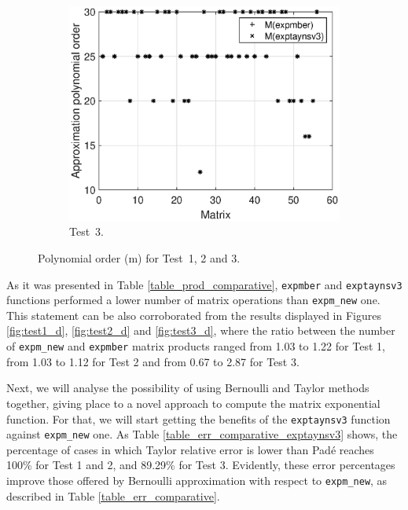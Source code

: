 \documentclass[preprint,10pt,numbers,sort&compress]{elsarticle}
\begin{document}
\begin{figure}[t]
\begin{subfigure}[b]{0.48\textwidth}
\end{subfigure}
\begin{subfigure}[b]{0.48\textwidth}
\includegraphics[scale=0.44]{polynomial_order_exp_toolbox_n128_nd256-exp_eigtool_n128_nd256_expmber.eps}
\caption{\footnotesize Test~3.}
\label{fig:m_value_test3}
\end{subfigure}
\caption{Polynomial order (m) for Test~1, 2 and 3.}
\label{fig:m_value}
\end{figure}

As it was presented in Table \ref{table_prod_comparative}, \texttt{expmber} and \texttt{exptaynsv3} functions performed a lower number of matrix operations than \texttt{expm\_new} one. This statement can be also corroborated from the results displayed in Figures \ref{fig:test1_d}, \ref{fig:test2_d} and \ref{fig:test3_d}, where the ratio between the number of \texttt{expm\_new} and \texttt{expmber} matrix products ranged from 1.03 to 1.22 for Test 1, from 1.03 to 1.12 for Test 2 and from 0.67 to 2.87 for Test 3.

Next, we will analyse the possibility of using Bernoulli and Taylor methods together, giving place to a novel approach to compute the matrix exponential function. For that, we will start getting the benefits of the \texttt{exptaynsv3} function against \texttt{expm\_new} one.  As Table \ref{table_err_comparative_exptaynsv3} shows, the percentage of cases in which Taylor relative error is lower than Pad\'e reaches 100\% for Test 1 and 2, and 89.29\% for Test 3. Evidently, these error percentages improve those offered by Bernoulli approximation with respect to \texttt{expm\_new}, as described in Table \ref{table_err_comparative}. 
\end{document}
